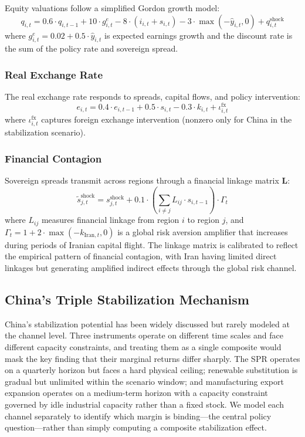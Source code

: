 \documentclass[12pt]{article}
\begin{document}
Equity valuations follow a simplified Gordon growth model:
\begin{equation}
q_{i,t} = 0.6 \cdot q_{i,t-1} + 10 \cdot g^e_{i,t} - 8 \cdot (i_{i,t} + s_{i,t}) - 3 \cdot \max(-\hat{y}_{i,t}, 0) + q^{\text{shock}}_{i,t}
\label{eq:equity}
\end{equation}
where $g^e_{i,t} = 0.02 + 0.5 \cdot \hat{y}_{i,t}$ is expected earnings growth and the discount rate is the sum of the policy rate and sovereign spread.

\subsubsection{Real Exchange Rate}

The real exchange rate responds to spreads, capital flows, and policy intervention:
\begin{equation}
e_{i,t} = 0.4 \cdot e_{i,t-1} + 0.5 \cdot s_{i,t} - 0.3 \cdot k_{i,t} + \iota^{\text{fx}}_{i,t}
\label{eq:rer}
\end{equation}
where $\iota^{\text{fx}}_{i,t}$ captures foreign exchange intervention (nonzero only for China in the stabilization scenario).

\subsubsection{Financial Contagion}

Sovereign spreads transmit across regions through a financial linkage matrix $\mathbf{L}$:
\begin{equation}
\tilde{s}^{\text{shock}}_{j,t} = s^{\text{shock}}_{j,t} + 0.1 \cdot \left(\sum_{i \neq j} L_{ij} \cdot s_{i,t-1}\right) \cdot \Gamma_t
\label{eq:contagion}
\end{equation}
where $L_{ij}$ measures financial linkage from region $i$ to region $j$, and $\Gamma_t = 1 + 2 \cdot \max(-k_{\text{Iran},t}, 0)$ is a global risk aversion amplifier that increases during periods of Iranian capital flight. The linkage matrix is calibrated to reflect the empirical pattern of financial contagion, with Iran having limited direct linkages but generating amplified indirect effects through the global risk channel.


\subsection{China's Triple Stabilization Mechanism}

China's stabilization potential has been widely discussed but rarely modeled at the channel level. Three instruments operate on different time scales and face different capacity constraints, and treating them as a single composite would mask the key finding that their marginal returns differ sharply. The SPR operates on a quarterly horizon but faces a hard physical ceiling; renewable substitution is gradual but unlimited within the scenario window; and manufacturing export expansion operates on a medium-term horizon with a capacity constraint governed by idle industrial capacity rather than a fixed stock. We model each channel separately to identify which margin is binding---the central policy question---rather than simply computing a composite stabilization effect.
\end{document}
